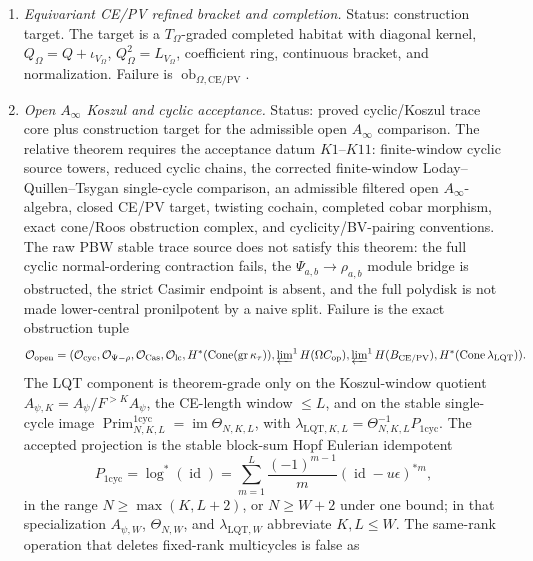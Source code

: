 \begin{enumerate}
  \item \emph{Equivariant CE/PV refined bracket and completion.}
  Status: construction target.  The target is a
  \(T_\Omega\)-graded completed habitat with diagonal kernel,
  \(Q_\Omega=Q+\iota_{V_\Omega}\), \(Q_\Omega^2=L_{V_\Omega}\),
  coefficient ring, continuous bracket, and normalization.  Failure is
  \(\operatorname{ob}_{\Omega,\mathrm{CE/PV}}\).

  \item \emph{Open \(A_\infty\) Koszul and cyclic acceptance.}
  Status: proved cyclic/Koszul trace core plus construction target for
  the admissible open \(A_\infty\) comparison.  The relative theorem
  requires the acceptance datum \(K1\)--\(K11\): finite-window cyclic
  source towers, reduced cyclic chains, the corrected finite-window
  Loday--Quillen--Tsygan single-cycle comparison, an admissible
  filtered open \(A_\infty\)-algebra,
  closed CE/PV target, twisting cochain, completed cobar morphism,
  exact cone/Roos obstruction complex, and cyclicity/BV-pairing
  conventions.  The raw PBW stable trace source does not satisfy this
  theorem: the full cyclic normal-ordering contraction fails, the
  \(\Psi_{a,b}\to\rho_{a,b}\) module bridge is obstructed, the strict
  Casimir endpoint is absent, and the full polydisk is not made
  lower-central pronilpotent by a naive split.  Failure is the exact
  obstruction tuple
  \[
    \mathcal O_{\mathrm{open}}
    =
    (\mathcal O_{\mathrm{cyc}},
     \mathcal O_{\Psi-\rho},
     \mathcal O_{\mathrm{Cas}},
     \mathcal O_{\mathrm{lc}},
     H^*(\operatorname{Cone}(\operatorname{gr}\kappa_{\tau})),
     \varprojlim\nolimits^1H(\Omega C_{\mathrm{op}}),
     \varprojlim\nolimits^1H(B_{\mathrm{CE/PV}}),
     H^*(\operatorname{Cone}\lambda_{\mathrm{LQT}})).
  \]
  The LQT component is theorem-grade only on the Koszul-window
  quotient \(A_{\psi,K}=A_\psi/F^{>K}A_\psi\), the CE-length window
  \(\le L\), and on the stable
  single-cycle image
  \(\operatorname{Prim}^{1\mathrm{cyc}}_{N,K,L}
  =\operatorname{im}\Theta_{N,K,L}\),
  with
  \(\lambda_{\mathrm{LQT},K,L}
  =\Theta_{N,K,L}^{-1}P_{1\mathrm{cyc}}\).
  The accepted projection is the stable block-sum Hopf Eulerian
  idempotent
  \[
    P_{1\mathrm{cyc}}
    =
    \log^*(\operatorname{id})
    =
    \sum_{m=1}^{L}\frac{(-1)^{m-1}}{m}
    (\operatorname{id}-u\epsilon)^{*m},
  \]
  in the range \(N\geq\max(K,L+2)\), or \(N\geq W+2\) under one bound;
  in that specialization \(A_{\psi,W}\), \(\Theta_{N,W}\), and
  \(\lambda_{\mathrm{LQT},W}\) abbreviate \(K,L\le W\).
  The same-rank operation that deletes fixed-rank multicycles is false as

\end{enumerate}
